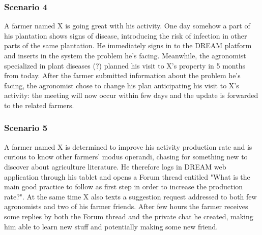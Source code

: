 \subsubsection*{Scenario 4}
A farmer named X is going great with his activity. One day somehow a part of his plantation shows signs of disease, introducing the risk of infection in other parts of the same plantation. He immediately signs in to the DREAM platform and inserts in the system the problem he's facing. Meanwhile, the agronomist specialized in plant diseases (?) planned his visit to X's property in 5 months from today. After the farmer submitted information about the problem he's facing, the agronomist chose to change his plan anticipating his visit to X's activity: the meeting will now occur within few days and the update is forwarded to the related farmers.

\subsubsection*{Scenario 5}
A farmer named X is determined to improve his activity production rate and is curious to know other farmers' modus operandi, chasing for something new to discover about agriculture literature. He therefore logs in DREAM web application through his tablet and opens a Forum thread entitled "What is the main good practice to follow as first step in order to increase the production rate?". At the same time X also texts a suggestion request addressed to both few agronomists and two of his farmer friends. After few hours the farmer receives some replies by both the Forum thread and the private chat he created, making him able to learn new stuff and potentially making some new friend.
